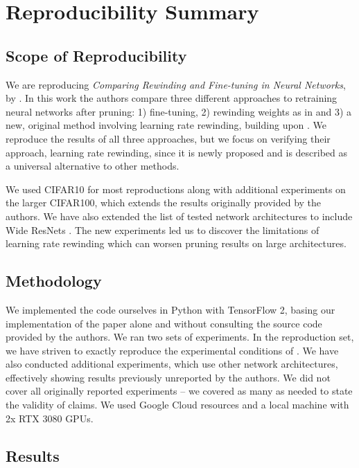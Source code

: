 \section{Reproducibility Summary}

\subsection*{Scope of Reproducibility}
    
We are reproducing \emph{Comparing Rewinding and Fine-tuning in Neural Networks}, by \cite{Renda}.
In this work the authors compare three different approaches to retraining neural networks after pruning: 1) fine-tuning, 2) rewinding weights as in \cite{Frankle} and 3) a new, original method involving learning rate rewinding, building upon \cite{Frankle}. We reproduce the results of all three approaches, but we focus on verifying their approach, learning rate rewinding, since it is newly proposed and is described as a universal alternative to other methods.

We used CIFAR10 for most reproductions along with additional experiments on the larger CIFAR100, which extends the results originally provided by the authors. We have also extended the list of tested network architectures to include Wide ResNets \cite{wrn}. The new experiments led us to discover the limitations of learning rate rewinding which can worsen pruning results on large architectures.

\subsection*{Methodology}

We implemented the code ourselves in Python with TensorFlow 2, basing our implementation of the paper alone and without consulting the source code provided by the authors. We ran two sets of experiments. In the reproduction set, we have striven to exactly reproduce the experimental conditions of \cite{Renda}. We have also conducted additional experiments, which use other network architectures, effectively showing results previously unreported by the authors. We did not cover all originally reported experiments -- we covered as many as needed to state the validity of claims. We used Google Cloud resources and a local machine with 2x RTX 3080 GPUs.

\subsection*{Results}

